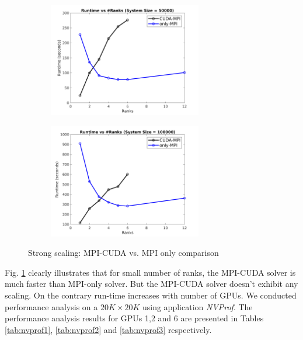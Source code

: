 \documentclass[sigplan,screen]{acmart}
\begin{document}
\begin{figure}
	\begin{subfigure}{0.35\textwidth}
		\includegraphics[trim= 10 5 35 10,clip, width=0.95\linewidth, height=5cm]{compare_strong_50k.png} 
		\caption{}
	\end{subfigure}
	\begin{subfigure}{0.35\textwidth}
		\includegraphics[trim= 10 5 35 10,clip, width=0.95\linewidth, height=5cm]{compare_strong_100k.png}
		\caption{}
	\end{subfigure}
	\caption{Strong scaling: MPI-CUDA vs. MPI only comparison}
	\label{compare_strong}
\end{figure}

Fig. \ref{compare_strong} clearly illustrates that for small number of ranks, the MPI-CUDA solver is much faster than MPI-only solver. But the MPI-CUDA solver doesn't exhibit any scaling. On the contrary run-time increases with number of GPUs. We conducted performance analysis on a $20K\times 20K$ using application \emph{NVProf}. The performance analysis results for GPUs 1,2 and 6 are presented in Tables \ref{tab:nvprof1}, \ref{tab:nvprof2} and \ref{tab:nvprof3} respectively.  
\end{document}
